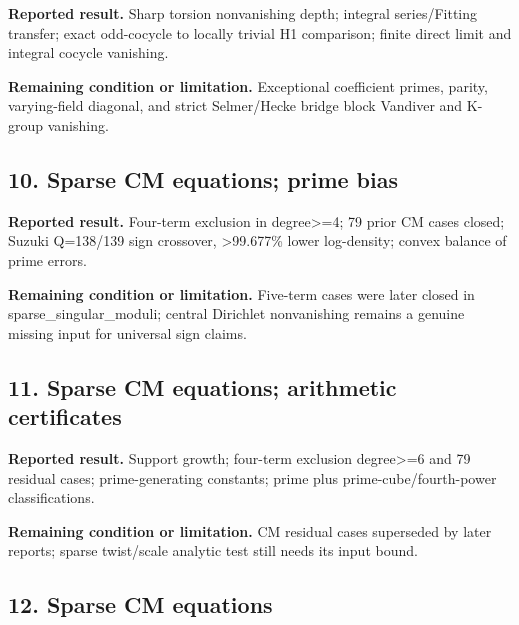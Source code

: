 \href{https://github.com/VladimirReshetnikov/ProveIt/blob/274841c1cb137aafbb60ab5f519c51fd42eee98e/docs/incoming/grh_beyond_dirichlet_grh_2026-11-25.zip}{}

\textbf{Reported result.} Sharp torsion nonvanishing depth; integral series/Fitting transfer; exact odd-cocycle to locally trivial H1 comparison; finite direct limit and integral cocycle vanishing.

\textbf{Remaining condition or limitation.} Exceptional coefficient primes, parity, varying-field diagonal, and strict Selmer/Hecke bridge block Vandiver and K-group vanishing.

\subsection*{10. Sparse CM equations; prime bias}

\href{https://github.com/VladimirReshetnikov/ProveIt/blob/274841c1cb137aafbb60ab5f519c51fd42eee98e/docs/incoming/grh_cm_four_terms_and_prime_bias.zip}{}

\textbf{Reported result.} Four-term exclusion in degree>=4; 79 prior CM cases closed; Suzuki Q=138/139 sign crossover, >99.677\% lower log-density; convex balance of prime errors.

\textbf{Remaining condition or limitation.} Five-term cases were later closed in sparse\_singular\_moduli; central Dirichlet nonvanishing remains a genuine missing input for universal sign claims.

\subsection*{11. Sparse CM equations; arithmetic certificates}

\href{https://github.com/VladimirReshetnikov/ProveIt/blob/274841c1cb137aafbb60ab5f519c51fd42eee98e/docs/incoming/grh_cm_prime_applications.zip}{}

\textbf{Reported result.} Support growth; four-term exclusion degree>=6 and 79 residual cases; prime-generating constants; prime plus prime-cube/fourth-power classifications.

\textbf{Remaining condition or limitation.} CM residual cases superseded by later reports; sparse twist/scale analytic test still needs its input bound.

\subsection*{12. Sparse CM equations}

